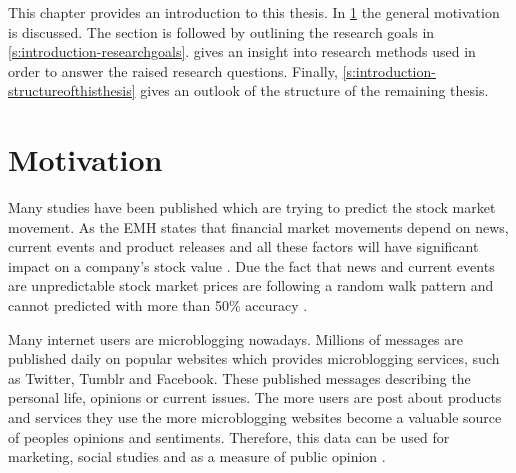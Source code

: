 



This chapter provides an introduction to this thesis.
In \cref{s:introduction-motivation} the general motivation is discussed.
The section is followed by outlining the research goals in \cref{s:introduction-researchgoals}.
 gives an insight into research methods used in order to answer the raised research questions.
Finally, \cref{s:introduction-structureofthisthesis} gives an outlook of the structure of the remaining thesis.

\section{Motivation}
\label{s:introduction-motivation}

Many studies have been published which are trying to predict the stock market movement.
As the \ac{EMH} states that financial market movements depend on news, current events and product releases and all these factors will have significant impact on a company's stock value
\cite{fama1965behavior}.
Due the fact that news and current events are unpredictable stock market prices are following a random walk pattern and cannot predicted with more than 50\% accuracy
\cite{Pagolu2016a}.

Many internet users are microblogging nowadays.
Millions of messages are published daily on popular websites which provides microblogging services, such as Twitter, Tumblr and Facebook.
These published messages describing the personal life, opinions or current issues.
The more users are post about products and services they use the more microblogging websites become a valuable source of peoples opinions and sentiments.
Therefore, this data can be used for marketing, social studies and as a measure of public opinion
\cite{Patodkar2016a, Pagolu2016a}.

